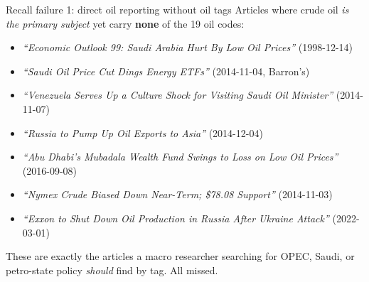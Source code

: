 \documentclass[10pt,aspectratio=169]{beamer}
\begin{document}
\begin{frame}{Recall failure 1: direct oil reporting without oil tags}
  \scriptsize
  Articles where crude oil \emph{is the primary subject} yet carry
  \textbf{none} of the 19 oil codes:

  \smallskip
  \begin{itemize}
    \item \textit{``Economic Outlook 99: Saudi Arabia Hurt By Low Oil Prices''} (1998-12-14)
    \item \textit{``Saudi Oil Price Cut Dings Energy ETFs''} (2014-11-04, Barron's)
    \item \textit{``Venezuela Serves Up a Culture Shock for Visiting Saudi Oil Minister''} (2014-11-07)
    \item \textit{``Russia to Pump Up Oil Exports to Asia''} (2014-12-04)
    \item \textit{``Abu Dhabi's Mubadala Wealth Fund Swings to Loss on Low Oil Prices''} (2016-09-08)
    \item \textit{``Nymex Crude Biased Down Near-Term; \$78.08 Support''} (2014-11-03)
    \item \textit{``Exxon to Shut Down Oil Production in Russia After Ukraine Attack''} (2022-03-01)
  \end{itemize}

  \smallskip
  These are exactly the articles a macro researcher searching for OPEC, Saudi,
  or petro-state policy \emph{should} find by tag. All missed.

\end{frame}
\end{document}
